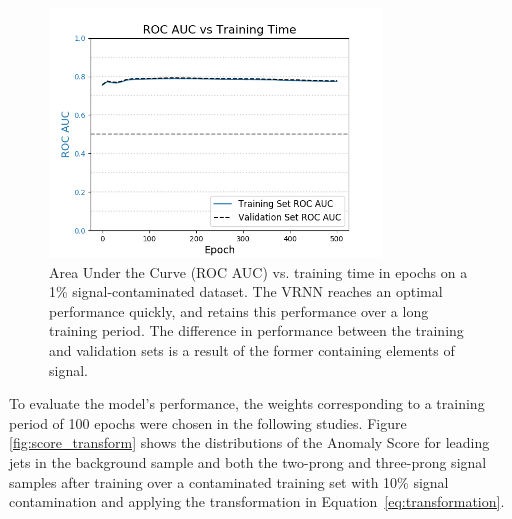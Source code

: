 \documentclass[11pt, a4paper]{article}
\begin{document}
\begin{figure}[H]
	\begin{center}
		\includegraphics[width=250pt]{imgs/bugfix/auc_vs_epoch_1p0_SaveForPaper.png}
	\end{center}
	\caption{Area Under the Curve (ROC AUC) vs. training time in epochs on a 1\% signal-contaminated dataset. The VRNN reaches an optimal performance quickly, and retains this performance over a long training period. The difference in performance between the training and validation sets is a result of the former containing elements of signal.}
	\label{fig:auc_vs_epoch}
\end{figure}


To evaluate the model's performance, the weights corresponding to a training period of 100 epochs were chosen in the following studies. Figure \ref{fig:score_transform} shows the distributions of the Anomaly Score for leading jets in the background sample and both the two-prong and three-prong signal samples after training over a contaminated training set with 10\% signal contamination and applying the transformation in Equation~\ref{eq:transformation}.
\end{document}
